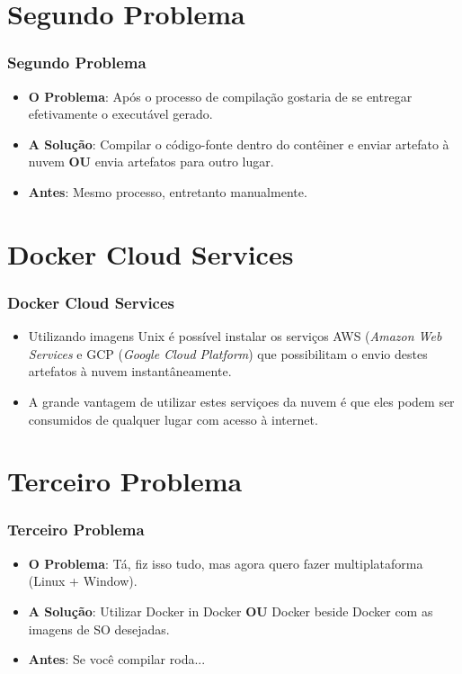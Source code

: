 \documentclass[10pt]{beamer}
\theoremstyle{remark}
\theoremstyle{definition}
\begin{document}
\section{Segundo Problema}
\begin{frame}[allowframebreaks]
\frametitle{Segundo Problema}
	\begin{itemize}
	
		\item \textbf{O Problema}: Após o processo de compilação gostaria de se entregar efetivamente o executável gerado. 
		
		\item \textbf{A Solução}: Compilar o código-fonte dentro do contêiner e enviar artefato à nuvem \textbf{OU} envia artefatos para outro lugar.
		
		\item \textbf{Antes}: Mesmo processo, entretanto manualmente.
		
	\end{itemize}
\end{frame}

\section{Docker Cloud Services}
\begin{frame}[allowframebreaks]
\frametitle{Docker Cloud Services}
	\begin{itemize}
	
		\item Utilizando imagens Unix é possível instalar os serviços AWS (\textit{Amazon Web Services} e GCP (\textit{Google Cloud Platform}) que possibilitam o envio destes artefatos à nuvem instantâneamente.
		
		\item A grande vantagem de utilizar estes serviçoes da nuvem é que eles podem ser consumidos de qualquer lugar com acesso à internet.
		
	\end{itemize}
\end{frame}

\section{Terceiro Problema}
\begin{frame}[allowframebreaks]
\frametitle{Terceiro Problema}
	\begin{itemize}
	
		\item \textbf{O Problema}: Tá, fiz isso tudo, mas agora quero fazer multiplataforma (Linux + Window). 
		
		\item \textbf{A Solução}: Utilizar Docker in Docker \textbf{OU} Docker beside Docker com as imagens de SO desejadas.
		
		\item \textbf{Antes}: Se você compilar roda...
		
	\end{itemize}
\end{frame}
\end{document}
